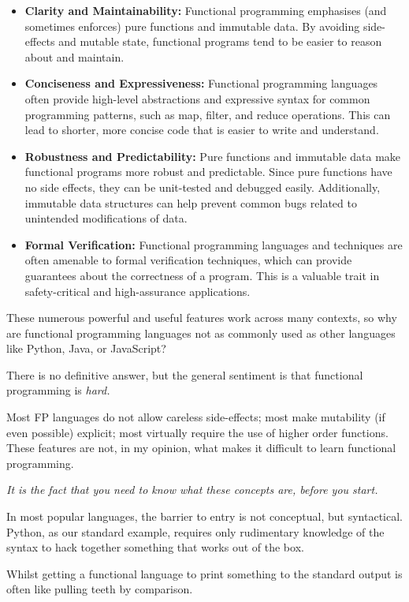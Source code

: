 \documentclass{l4proj}
\begin{document}
\begin{itemize}
    \item \textbf{Clarity and Maintainability:} Functional programming emphasises (and sometimes enforces) pure functions and immutable data.
    By avoiding side-effects and mutable state, functional programs tend to be easier to reason about and maintain.
    \item \textbf{Conciseness and Expressiveness:} Functional programming languages often provide high-level abstractions and expressive syntax for common programming patterns, such as map, filter, and reduce operations.
    This can lead to shorter, more concise code that is easier to write and understand.
    \item \textbf{Robustness and Predictability:} Pure functions and immutable data make functional programs more robust and predictable.
    Since pure functions have no side effects, they can be unit-tested and debugged easily.
    Additionally, immutable data structures can help prevent common bugs related to unintended modifications of data.
    \item \textbf{Formal Verification:} Functional programming languages and techniques are often amenable to formal verification techniques, which can provide guarantees about the correctness of a program.
    This is a valuable trait in safety-critical and high-assurance applications.
\end{itemize}

These numerous powerful and useful features work across many contexts, so why are functional programming languages not as commonly used as other languages like Python, Java, or JavaScript?

There is no definitive answer, but the general sentiment is that functional programming is \emph{hard.}

Most FP languages do not allow careless side-effects; most make mutability (if even possible) explicit; most virtually require the use of higher order functions. 
These features are not, in my opinion, what makes it difficult to learn functional programming. 

\emph{It is the fact that you need to know what these concepts are, before you start.}

In most popular languages, the barrier to entry is not conceptual, but syntactical.
Python, as our standard example, requires only rudimentary knowledge of the syntax to hack together something that works out of the box.

Whilst getting a functional language to print something to the standard output is often like pulling teeth by comparison.
\end{document}
